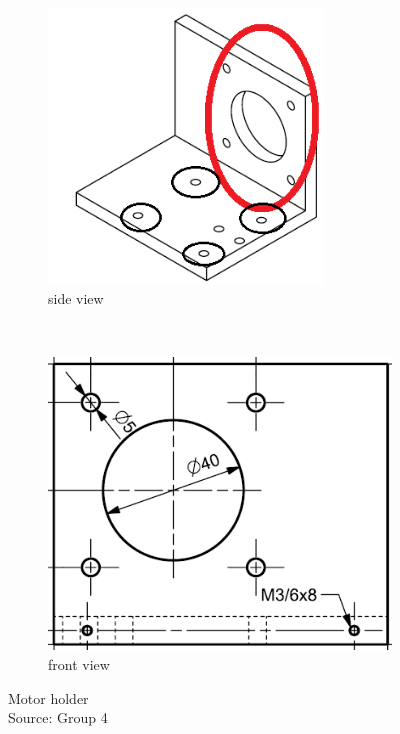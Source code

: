 \documentclass[a4paper,12pt]{scrreprt}
\begin{document}
  \begin{figure} [H]
        \centering
        \begin{subfigure}[b]{0.45\textwidth}
                \centering
                \includegraphics[width=0.8\textwidth]{pictures/frame1_2_2}
                \caption{side view}\label{fig:motor frame side view}
        \end{subfigure}%
        ~ %
        \begin{subfigure}[b]{0.45\textwidth}
                \centering
                \includegraphics[width=1\textwidth]{pictures/frame1_5}
                \caption{front view}\label{fig:motor frame front view}
        \end{subfigure}
        \caption[Motor holder]{Motor holder\\
        Source: Group 4}\label{fig:motor frame}
  \end{figure}
\end{document}
